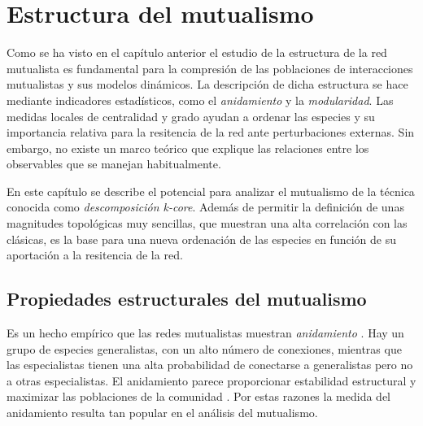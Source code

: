 
\chapter{Estructura del mutualismo} %
\label{ChapterESTATICA}  %


Como se ha visto en el capítulo anterior el estudio de la estructura de la red mutualista es fundamental para la compresión de las poblaciones de interacciones mutualistas y  sus modelos dinámicos. 
La descripción de dicha estructura se hace mediante indicadores estadísticos, como el \textit{anidamiento}
y la \textit{modularidad}. Las medidas locales de centralidad y grado ayudan a ordenar las especies y su importancia relativa para
la resitencia de la red ante perturbaciones externas. Sin embargo, no existe un marco teórico que explique las relaciones entre los observables
que se manejan habitualmente.

En este capítulo se describe el potencial para analizar el mutualismo de la técnica conocida como \textit{descomposición k-core}. Además
de permitir la definición de unas magnitudes topológicas muy sencillas, que muestran una alta correlación con las clásicas, es la base
para una nueva ordenación de las especies en función de su aportación a la resitencia de la red.


\section{Propiedades estructurales del mutualismo}

Es un hecho empírico que las redes mutualistas muestran \textit{anidamiento} \cite{bascompte2003nested}. Hay un grupo de especies generalistas, con un alto número de conexiones, mientras que las especialistas tienen una alta probabilidad de conectarse a generalistas pero no a otras especialistas. El anidamiento parece proporcionar estabilidad estructural y maximizar las poblaciones de la comunidad \cite{thebault2010stability, suweis2013emergence}. Por estas razones la medida del anidamiento resulta tan popular en el análisis del mutualismo. 

